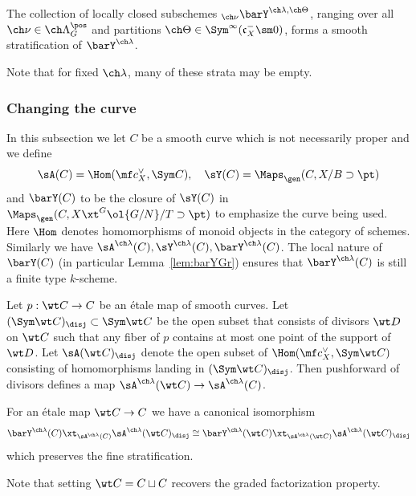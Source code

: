 \begin{prop}
\notready  \label{prop:barYstrata}
The collection of locally closed subschemes
${}_{\ch\nu} \barY^{\ch\lambda,\ch\Theta}$, ranging over all $\ch\nu\in \ch\Lambda^\pos_G$ and partitions $\ch\Theta \in \Sym^\infty(\mathfrak c_X^-\sm 0)$,
forms a smooth stratification of $\barY^{\ch\lambda}$.
\end{prop}

Note that for fixed $\ch\lambda$, many of these strata may be empty.


\subsubsection{Changing the curve}

In this subsection we let $C$ be a smooth curve which is not necessarily proper
and we define
\[ \sA(C) = \Hom( \mf c_X^\vee, \Sym C), \quad
\sY(C)=\Maps_\gen(C, X/B\supset \pt) \]
and $\barY(C)$ to be the closure
of $\sY(C)$ in $\Maps_\gen(C, X \xt^G \ol{G/N}/T \supset \pt)$ to emphasize
the curve being used.
Here $\Hom$ denotes homomorphisms of monoid objects in the category of schemes.
Similarly we have $\sA^{\ch\lambda}(C), \sY^{\ch\lambda}(C),\barY^{\ch\lambda}(C)$.
The local nature of $\barY(C)$
(in particular Lemma~\ref{lem:barYGr}) ensures that $\barY^{\ch\lambda}(C)$ is still
a finite type $k$-scheme.



Let $p: \wt C \to C$ be an \'etale map of smooth curves.
Let $(\Sym \wt C)_\disj \subset \Sym \wt C$
be the open subset that consists of divisors $\wt D$ on $\wt C$ such that
any fiber of $p$ contains at most one point of the support of $\wt D$.
Let $\sA(\wt C)_\disj$ denote the open subset of
$\Hom(\mf c_X^\vee, \Sym \wt C)$ consisting of homomorphisms landing in $(\Sym \wt C)_\disj$.
Then pushforward of divisors defines a map
$\sA^{\ch\lambda}(\wt C) \to \sA^{\ch\lambda}(C)$.

\begin{prop}
\notready \label{prop:changecurve}
For an \'etale map $\wt C \to C$ we have a canonical isomorphism
\[ \barY^{\ch\lambda}(C) \xt_{\sA^{\ch\lambda}(C)} \sA^{\ch\lambda}(\wt C)_\disj
\cong \barY^{\ch\lambda}(\wt C) \xt_{\sA^{\ch\lambda}(\wt C)} \sA^{\ch\lambda}(\wt C)_\disj
\]
which preserves the fine stratification.
\end{prop}
Note that setting $\wt C = C\sqcup C$ recovers the graded factorization property.

